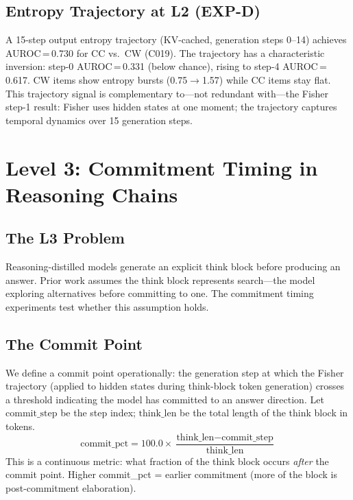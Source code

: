 \documentclass[11pt]{article}
\begin{document}
\subsection{Entropy Trajectory at L2 (EXP-D)}

A 15-step output entropy trajectory (KV-cached, generation steps 0--14) achieves
AUROC\,=\,0.730 for CC vs.\ CW (C019). The trajectory has a characteristic inversion:
step-0 AUROC\,=\,0.331 (below chance), rising to step-4 AUROC\,=\,0.617. CW items
show entropy bursts (0.75$\to$1.57) while CC items stay flat. This trajectory signal
is complementary to---not redundant with---the Fisher step-1 result: Fisher uses
hidden states at one moment; the trajectory captures temporal dynamics over 15
generation steps.

\section{Level 3: Commitment Timing in Reasoning Chains}
\label{sec:l3}

\subsection{The L3 Problem}

Reasoning-distilled models generate an explicit think block before producing an answer.
Prior work assumes the think block represents search---the model exploring alternatives
before committing to one. The commitment timing experiments test whether this assumption
holds.

\subsection{The Commit Point}

We define a commit point operationally: the generation step at which the Fisher
trajectory (applied to hidden states during think-block token generation) crosses a
threshold indicating the model has committed to an answer direction. Let
$\text{commit\_step}$ be the step index; $\text{think\_len}$ be the total length of
the think block in tokens.
\[
\text{commit\_pct} = 100.0 \times
\frac{\text{think\_len} - \text{commit\_step}}{\text{think\_len}}
\]
This is a continuous metric: what fraction of the think block occurs \emph{after} the
commit point. Higher commit\_pct = earlier commitment (more of the block is
post-commitment elaboration).
\end{document}
